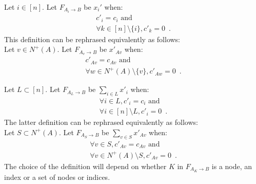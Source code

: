 \begin{definition}

   Let $i \in [n]$. Let $F_{A_i \rightarrow B}$ be $x_i'$ when:
   \begin{equation*}
   \begin{gathered}
      c'_i = c_i \mbox{ and} \\
      \forall k \in [n] \setminus \{i\}, c'_k = 0 \enspace.
   \end{gathered}
   \end{equation*}
   This definition can be rephrased equivalently as follows: \\
   Let $v \in N^{+}\left(A\right)$. Let $F_{A_v \rightarrow B}$ be $x'_{Av}$ when:
   \begin{equation*}
   \begin{gathered}
      c'_{Av} = c_{Av} \mbox{ and} \\
      \forall w \in N^{+}\left(A\right) \setminus \{v\}, c'_{Aw} = 0 \enspace.
   \end{gathered}
   \end{equation*}

   Let $L \subset [n]$. Let $F_{A_L \rightarrow B}$ be $\sum\limits_{i \in L}x'_i$ when:
   \begin{equation*}
   \begin{gathered}
      \forall i \in L, c'_i = c_i \mbox{ and} \\ 
      \forall i \in [n] \setminus L, c'_i = 0 \enspace.
   \end{gathered}
   \end{equation*} 
   The latter definition can be rephrased equivalently as follows: \\
   Let $S \subset N^{+}\left(A\right)$. Let $F_{A_S \rightarrow B}$ be
   $\sum\limits_{v \in S}x'_{Av}$ when:
   \begin{equation*}
   \begin{gathered}
      \forall v \in S, c'_{Av} = c_{Av} \mbox{ and} \\
      \forall v \in N^{+}\left(A\right) \setminus S, c'_{Av} = 0 \enspace.
   \end{gathered}
   \end{equation*}
   The choice of the definition will depend on whether $K$ in $F_{A_K \rightarrow B}$ is a node, an index or a set of nodes
   or indices.
\end{definition}
